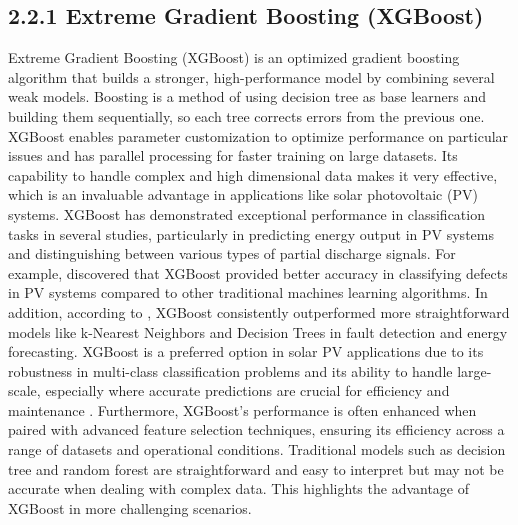 \subsection{2.2.1 Extreme Gradient Boosting (XGBoost) }
Extreme Gradient Boosting (XGBoost) is an optimized gradient boosting algorithm that builds a stronger, high-performance model by combining several weak models. Boosting is a method of using decision tree as base learners and building them sequentially, so each tree corrects errors from the previous one. XGBoost enables parameter customization to optimize performance on particular issues and has parallel processing for faster training on large datasets. Its capability to handle complex and high dimensional data makes it very effective, which is an invaluable advantage in applications like solar photovoltaic (PV) systems. XGBoost has demonstrated exceptional performance in classification tasks in several studies, particularly in predicting energy output in PV systems and distinguishing between various types of partial discharge signals. For example, \parencite{Kumar et al._2020} discovered that XGBoost provided better accuracy in classifying defects in PV systems compared to other traditional machines learning algorithms. In addition, according to \parencite{Zhang et al._2020}, XGBoost consistently outperformed more straightforward models like k-Nearest Neighbors and Decision Trees in fault detection and energy forecasting. XGBoost is a preferred option in solar PV applications due to its robustness in multi-class classification problems and its ability to handle large-scale, especially where accurate predictions are crucial for efficiency and maintenance \parencite{Shen et al._2020}. Furthermore, XGBoost’s performance is often enhanced when paired with advanced feature selection techniques, ensuring its efficiency across a range of datasets and operational conditions. Traditional models such as decision tree and random forest are straightforward and easy to interpret but may not be accurate when dealing with complex data. This highlights the advantage of XGBoost in more challenging scenarios.

